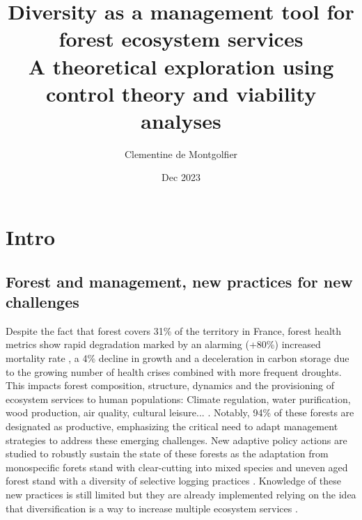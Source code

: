 \documentclass{article}
\title{Diversity as a management tool for forest ecosystem services \\ 
\large A theoretical exploration using control theory and viability analyses}
\author{Clementine de Montgolfier}
\date{Dec 2023}
\begin{document}





\newpage

%

\newpage

\begin{singlespace}
    \tableofcontents
\end{singlespace}

\newpage


\section{Intro}

\subsection{Forest and management, new practices for new challenges}

Despite the fact that forest covers 31\% of the territory in France, forest health metrics show rapid degradation  marked by an alarming (+80\%)  increased mortality rate \autocite{INVENTAIREFORESTIER}, a 4\% decline in growth and a deceleration in carbon storage due to the growing number of health crises combined with more frequent droughts. This impacts forest composition, structure, dynamics and the provisioning of ecosystem services to human populations: Climate regulation, water purification, wood production, air quality, cultural leisure... \autocite{grammatikopoulouValueForestEcosystem2021}. Notably, 94\% of these forests are designated as productive, emphasizing the critical need to adapt management strategies to address these emerging challenges. 
New adaptive policy actions are studied to robustly sustain the state of these forests as the adaptation from monospecific forets stand with clear-cutting into mixed species and uneven aged forest stand with a diversity of selective logging practices \autocite{raymondIrregularShelterwoodSystem2009}. Knowledge of these new practices is still limited but they are already implemented relying on the idea that diversification is a way to increase multiple ecosystem services \autocite{tilmanBiodiversityPopulationEcosystem1996}.
\end{document}
